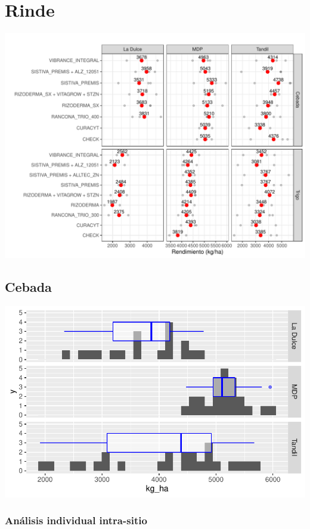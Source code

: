 \documentclass[
  letterpaper,
  DIV=11,
  numbers=noendperiod]{scrartcl}
\begin{document}
\hypertarget{rinde}{%
\section{Rinde}\label{rinde}}

\includegraphics{curasem_files/figure-pdf/unnamed-chunk-17-1.pdf}

\hypertarget{cebada-1}{%
\subsection{Cebada}\label{cebada-1}}

\includegraphics{curasem_files/figure-pdf/unnamed-chunk-19-1.pdf}

\hypertarget{anuxe1lisis-individual-intra-sitio}{%
\subsubsection{Análisis individual
intra-sitio}\label{anuxe1lisis-individual-intra-sitio}}
\end{document}
